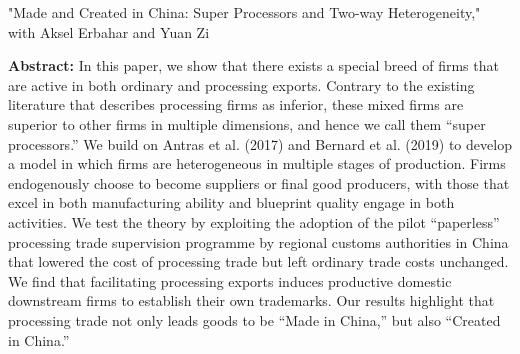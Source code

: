 \documentclass[letterpaper]{article}
\begin{document}
 \vspace{0.05in}
 "Made and Created in China: Super Processors and Two-way Heterogeneity," with Aksel Erbahar and Yuan Zi
   \vspace{0.05in}
 \begin{center}
 \begin{minipage}{0.9\linewidth}
   \textbf{Abstract:} In this paper, we show that there exists a special breed of firms that are active in both ordinary and processing exports. Contrary to the existing literature that describes processing firms as inferior, these mixed firms are superior to other firms in multiple dimensions, and hence we call them “super processors.” We build on Antras et al. (2017) and Bernard et al. (2019) to develop a model in which firms are heterogeneous in multiple stages of production. Firms endogenously choose to become suppliers or final good producers, with those that excel in both manufacturing ability and blueprint quality engage in both activities. We test the theory by exploiting the adoption of the pilot “paperless” processing trade supervision programme by regional customs authorities in China that lowered the cost of processing trade but left ordinary trade costs unchanged. We find that facilitating processing exports induces productive domestic downstream firms to establish their own trademarks. Our results highlight that processing trade not only leads goods to be “Made in China,” but also “Created in China.”
 \end{minipage}
 \end{center}
\end{document}
